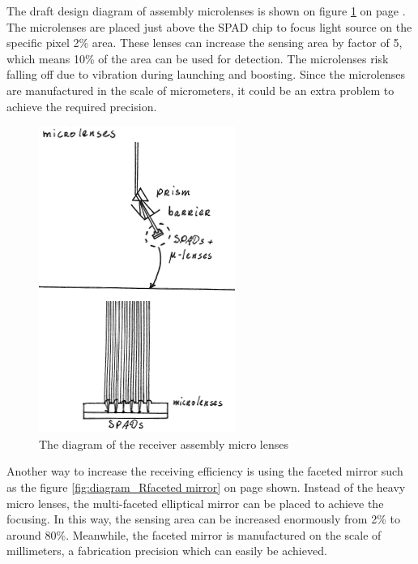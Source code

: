 The draft design diagram of assembly microlenses is shown on figure \ref{fig:diagram_Rmicrolenses} on page \pageref{fig:diagram_Rmicrolenses}. The microlenses are placed just above the \acs{SPAD} chip to focus light source on the specific pixel 2\% area. These lenses can increase the sensing area by factor of 5, which means 10\% of the area can be used for detection. The microlenses risk falling off due to vibration during launching and boosting. Since the microlenses are manufactured in the scale of micrometers, it could be an extra problem to achieve the required precision.

\begin{figure}[ht!]
\centering
\includegraphics[scale = 0.6]{chapters/img/DiagramReceiverAssemblyMicrolenses.png}
\caption{The diagram of the receiver assembly micro lenses}
\label{fig:diagram_Rmicrolenses}
\end{figure}

Another way to increase the receiving efficiency is using the faceted mirror such as the figure \ref{fig:diagram_Rfaceted mirror} on page \pageref{fig:diagram_Rfaceted mirror} shown. Instead of the heavy micro lenses, the multi-faceted elliptical mirror can be placed to achieve the focusing. In this way, the sensing area can be increased enormously from 2\% to around 80\%. Meanwhile, the faceted mirror is manufactured on the scale of millimeters, a fabrication precision which can easily be achieved.

